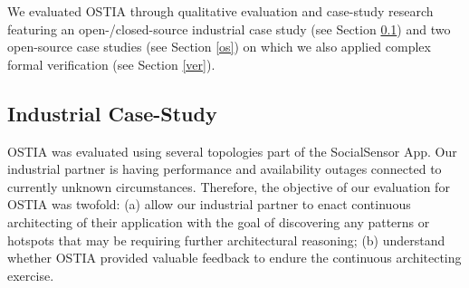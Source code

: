 
We evaluated OSTIA through qualitative evaluation and case-study research featuring an open-/closed-source industrial case study (see Section \ref{cs}) and two open-source case studies (see Section \ref{os}) on which we also applied complex formal verification (see Section \ref{ver}).

\subsection{Industrial Case-Study}\label{cs}

OSTIA was evaluated using several topologies part of the SocialSensor App. Our industrial partner is having
performance and availability outages connected to currently unknown
circumstances. Therefore, the objective of our evaluation for OSTIA was twofold:
(a) allow our industrial partner to enact continuous architecting of their
application with the goal of discovering any patterns or hotspots that may be
requiring further architectural reasoning; (b) understand whether OSTIA provided
valuable feedback to endure the continuous architecting exercise.

